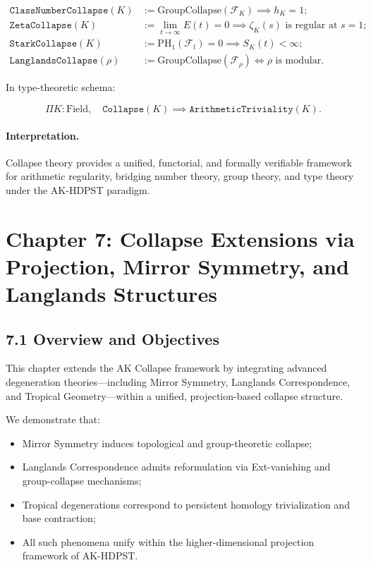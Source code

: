 \documentclass[11pt]{article}
\begin{document}
\begin{align*}
\texttt{ClassNumberCollapse}(K) &:= \mathrm{GroupCollapse}(\mathcal{F}_K) \implies h_K = 1; \\
\texttt{ZetaCollapse}(K) &:= \lim_{t \to \infty} E(t) = 0 \implies \zeta_K(s) \text{ is regular at } s = 1; \\
\texttt{StarkCollapse}(K) &:= \mathrm{PH}_1(\mathcal{F}_t) = 0 \implies S_K(t) < \infty; \\
\texttt{LanglandsCollapse}(\rho) &:= \mathrm{GroupCollapse}(\mathcal{F}_\rho) \iff \rho \text{ is modular}.
\end{align*}

In type-theoretic schema:

\[
\Pi K : \mathrm{Field}, \quad \texttt{Collapse}(K) \implies \texttt{ArithmeticTriviality}(K).
\]

\paragraph{Interpretation.}
Collapse theory provides a unified, functorial, and formally verifiable framework for arithmetic regularity, bridging number theory, group theory, and type theory under the AK-HDPST paradigm.



\section{Chapter 7: Collapse Extensions via Projection, Mirror Symmetry, and Langlands Structures}

\subsection*{7.1 Overview and Objectives}

This chapter extends the AK Collapse framework by integrating advanced degeneration theories—including Mirror Symmetry, Langlands Correspondence, and Tropical Geometry—within a unified, projection-based collapse structure.

We demonstrate that:

\begin{itemize}
    \item Mirror Symmetry induces topological and group-theoretic collapse;
    \item Langlands Correspondence admits reformulation via Ext-vanishing and group-collapse mechanisms;
    \item Tropical degenerations correspond to persistent homology trivialization and base contraction;
    \item All such phenomena unify within the higher-dimensional projection framework of AK-HDPST.
\end{itemize}
\end{document}
